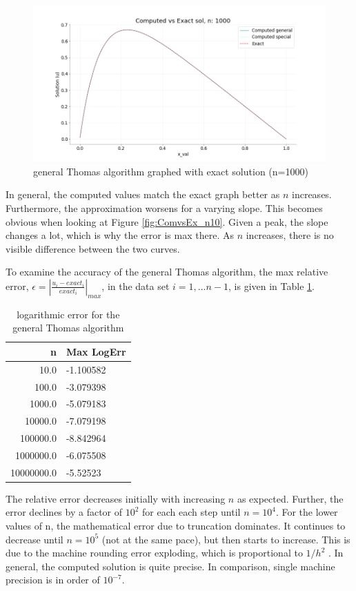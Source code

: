 \documentclass[%
oneside,                 %
final,                   %
10pt]{article}
\begin{document}
\begin{figure}[H]
\begin{center}
\graphicspath{ {ComputedvsExact/} }
\includegraphics[width=13cm]{ComputedvsExact_sol_n1000.png}
\caption{general Thomas algorithm graphed with exact solution (n=1000)}
\end{center}
\end{figure}
In general, the computed values match the exact graph better as $n$ increases. Furthermore, the approximation worsens for a varying slope. This becomes obvious when looking at Figure \ref{fig:ComvsEx_n10}. 
Given a peak, the slope changes a lot, which is why the error is max there. 
As $n$ increases, there is no visible difference between the two curves. 

To examine the accuracy of the general Thomas algorithm, the max relative error, $  \epsilon =  \left\lvert \frac{u_i-exact_i}{exact_i} \right\rvert_{max}$, in the data set $i=1,...n-1$, is given in Table \ref{LogError}. 
\begin{table}[H]
\caption{logarithmic error for the general Thomas algorithm}
\centering

\begin{tabular}{rl}
\toprule
     n &              Max LogErr \\
\midrule
    10.0 & -1.100582\\
   100.0 &  -3.079398\\
   1000.0 & -5.079183\\
  10000.0 &  -7.079198\\
  100000.0 &  -8.842964 \\
 1000000.0 &  -6.075508 \\
 10000000.0 &  -5.52523 \\
\bottomrule
\end{tabular}
\label{LogError}
\end{table}
The relative error decreases initially with increasing $n$ as expected. Further, the error declines by a factor of $10^2$ for each each step until $n=10^4$. For the lower values of n, the mathematical error due to truncation dominates. It continues to decrease until $n=10^5$ (not at the same pace), but then starts to increase. This is due to the machine rounding error exploding, which is proportional to $1/h^2$ \cite{FYS3150LectureNotes}. In general, the computed solution is quite precise. In comparison, single machine precision is in order of $10^{-7}$. 
\end{document}
